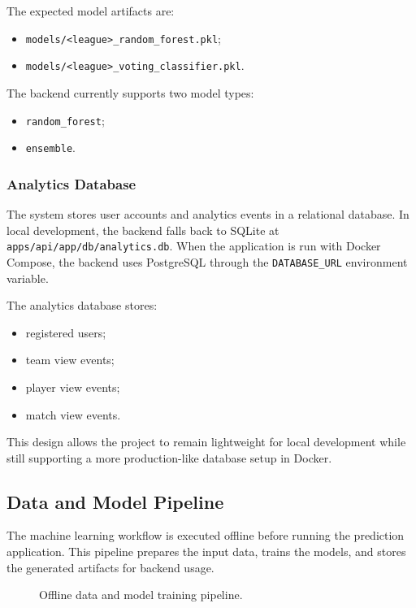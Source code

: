The expected model artifacts are:

\begin{itemize}
    \item \texttt{models/<league>\_random\_forest.pkl};
    \item \texttt{models/<league>\_voting\_classifier.pkl}.
\end{itemize}

The backend currently supports two model types:

\begin{itemize}
    \item \texttt{random\_forest};
    \item \texttt{ensemble}.
\end{itemize}

\subsubsection{Analytics Database}

The system stores user accounts and analytics events in a relational database. In local development, the backend falls back to SQLite at \texttt{apps/api/app/db/analytics.db}. When the application is run with Docker Compose, the backend uses PostgreSQL through the \texttt{DATABASE\_URL} environment variable.

The analytics database stores:

\begin{itemize}
    \item registered users;
    \item team view events;
    \item player view events;
    \item match view events.
\end{itemize}

This design allows the project to remain lightweight for local development while still supporting a more production-like database setup in Docker.

\subsection{Data and Model Pipeline}
\label{subsec:data-model-pipeline}

The machine learning workflow is executed offline before running the prediction application. This pipeline prepares the input data, trains the models, and stores the generated artifacts for backend usage.

\begin{figure}[htbp]
    \centering
    \caption{Offline data and model training pipeline.}
    \label{fig:data-pipeline}
\end{figure}

